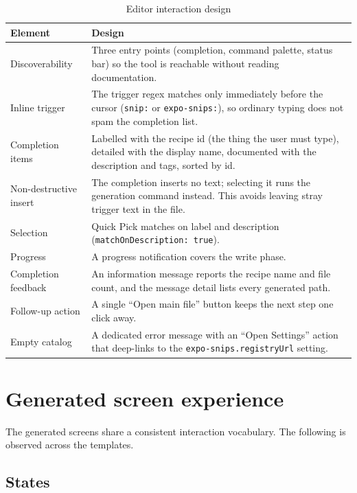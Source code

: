 \begin{longtable}{p{4cm}p{10.2cm}}
\caption{Editor interaction design}\\
\toprule
\textbf{Element} & \textbf{Design} \\
\midrule

Discoverability & Three entry points (completion, command palette, status bar) so the
tool is reachable without reading documentation. \\
Inline trigger & The trigger regex matches only immediately before the cursor
(\texttt{snip:} or \texttt{expo-snips:}), so ordinary typing does not spam the
completion list. \\
Completion items & Labelled with the recipe id (the thing the user must type),
detailed with the display name, documented with the description and tags, sorted by
id. \\
Non-destructive insert & The completion inserts no text; selecting it runs the
generation command instead. This avoids leaving stray trigger text in the file. \\
Selection & Quick Pick matches on label and description
(\texttt{matchOnDescription: true}). \\
Progress & A progress notification covers the write phase. \\
Completion feedback & An information message reports the recipe name and file count,
and the message detail lists every generated path. \\
Follow-up action & A single ``Open main file'' button keeps the next step one click
away. \\
Empty catalog & A dedicated error message with an ``Open Settings'' action that
deep-links to the \texttt{expo-snips.registryUrl} setting. \\
\bottomrule
\end{longtable}

\section{Generated screen experience}

The generated screens share a consistent interaction vocabulary. The following is
observed across the templates.

\subsection*{States}

